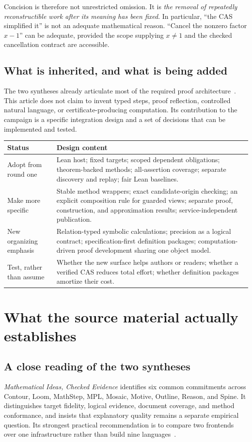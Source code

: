 \documentclass[11pt,a4paper]{article}
\theoremstyle{remark}\newtheorem{example}[proposition]{Example}
\begin{document}
Concision is therefore not unrestricted omission. It is \emph{the removal of repeatedly reconstructible work after its meaning has been fixed}. In particular, ``the CAS simplified it'' is not an adequate mathematical reason. ``Cancel the nonzero factor $x-1$'' can be adequate, provided the scope supplying $x\ne1$ and the checked cancellation contract are accessible.

\subsection{What is inherited, and what is being added}
The two syntheses already articulate most of the required proof architecture~\cite{synthesis,blueprints}. This article does not claim to invent typed steps, proof reflection, controlled natural language, or certificate-producing computation. Its contribution to the campaign is a specific integration design and a set of decisions that can be implemented and tested.
\begin{tabularx}{\textwidth}{@{}P{.25\textwidth}Y@{}}
\toprule
Status & Design content \\
\midrule
Adopt from round one & Lean host; fixed targets; scoped dependent obligations; theorem-backed methods; all-assertion coverage; separate discovery and replay; fair Lean baselines.\\
Make more specific & Stable method wrappers; exact candidate-origin checking; an explicit composition rule for guarded views; separate proof, construction, and approximation results; service-independent publication.\\
New organizing emphasis & Relation-typed symbolic calculations; precision as a logical contract; specification-first definition packages; computation-driven proof development sharing one object model.\\
Test, rather than assume & Whether the new surface helps authors or readers; whether a verified CAS reduces total effort; whether definition packages amortize their cost.\\
\bottomrule
\end{tabularx}

\section{What the source material actually establishes}\label{sec:reading}
\subsection{A close reading of the two syntheses}
\emph{Mathematical Ideas, Checked Evidence} identifies six common commitments across Contour, Loom, MathStep, MPL, Mosaic, Motive, Outline, Reason, and Spine. It distinguishes target fidelity, logical evidence, document coverage, and method conformance, and insists that explanatory quality remains a separate empirical question. Its strongest practical recommendation is to compare two frontends over one infrastructure rather than build nine languages~\cite{synthesis}.
\end{document}
